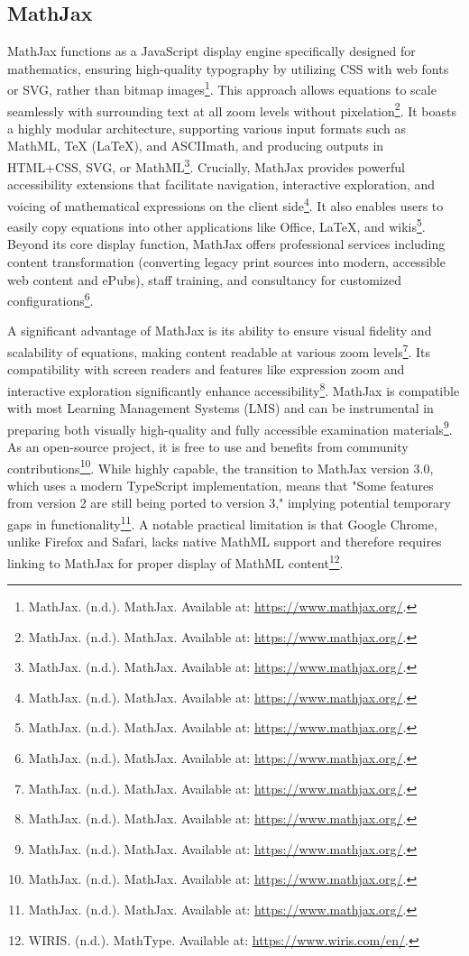 \subsection{MathJax}

MathJax functions as a JavaScript display engine specifically designed for mathematics, ensuring high-quality typography by utilizing CSS with web fonts or SVG, rather than bitmap images\footnote{MathJax. (n.d.). MathJax. Available at: \url{https://www.mathjax.org/}.}. This approach allows equations to scale seamlessly with surrounding text at all zoom levels without pixelation\footnote{MathJax. (n.d.). MathJax. Available at: \url{https://www.mathjax.org/}.}. It boasts a highly modular architecture, supporting various input formats such as MathML, TeX (LaTeX), and ASCIImath, and producing outputs in HTML+CSS, SVG, or MathML\footnote{MathJax. (n.d.). MathJax. Available at: \url{https://www.mathjax.org/}.}. Crucially, MathJax provides powerful accessibility extensions that facilitate navigation, interactive exploration, and voicing of mathematical expressions on the client side\footnote{MathJax. (n.d.). MathJax. Available at: \url{https://www.mathjax.org/}.}. It also enables users to easily copy equations into other applications like Office, LaTeX, and wikis\footnote{MathJax. (n.d.). MathJax. Available at: \url{https://www.mathjax.org/}.}. Beyond its core display function, MathJax offers professional services including content transformation (converting legacy print sources into modern, accessible web content and ePubs), staff training, and consultancy for customized configurations\footnote{MathJax. (n.d.). MathJax. Available at: \url{https://www.mathjax.org/}.}.

A significant advantage of MathJax is its ability to ensure visual fidelity and scalability of equations, making content readable at various zoom levels\footnote{MathJax. (n.d.). MathJax. Available at: \url{https://www.mathjax.org/}.}. Its compatibility with screen readers and features like expression zoom and interactive exploration significantly enhance accessibility\footnote{MathJax. (n.d.). MathJax. Available at: \url{https://www.mathjax.org/}.}. MathJax is compatible with most Learning Management Systems (LMS) and can be instrumental in preparing both visually high-quality and fully accessible examination materials\footnote{MathJax. (n.d.). MathJax. Available at: \url{https://www.mathjax.org/}.}. As an open-source project, it is free to use and benefits from community contributions\footnote{MathJax. (n.d.). MathJax. Available at: \url{https://www.mathjax.org/}.}. While highly capable, the transition to MathJax version 3.0, which uses a modern TypeScript implementation, means that "Some features from version 2 are still being ported to version 3," implying potential temporary gaps in functionality\footnote{MathJax. (n.d.). MathJax. Available at: \url{https://www.mathjax.org/}.}. A notable practical limitation is that Google Chrome, unlike Firefox and Safari, lacks native MathML support and therefore requires linking to MathJax for proper display of MathML content\footnote{WIRIS. (n.d.). MathType. Available at: \url{https://www.wiris.com/en/}.}.

